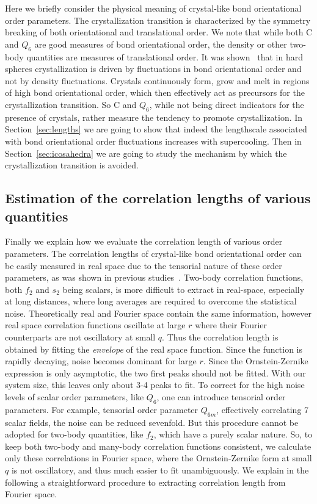 \documentclass[twocolumn,superscriptaddress]{revtex4}
\begin{document}
Here we briefly consider the physical meaning of crystal-like bond orientational order parameters.  
The crystallization transition is characterized by
the symmetry breaking of both orientational and translational order.
We note that while both $\text{C}$ and $Q_6$ are good measures of bond orientational order, the density or other two-body
quantities are measures of translational order.  It was shown~\cite{russo_hs} that in hard spheres crystallization is
driven by fluctuations in bond orientational order and not by density fluctuations. Crystals continuously form, grow and melt
in regions of high bond orientational order, which then effectively act as precursors for the crystallization transition.
So $\text{C}$ and $Q_6$, while not
being direct indicators for the presence of crystals, rather measure the tendency to promote crystallization. 
In Section~\ref{sec:lengths} we are going to show
that indeed the lengthscale associated with bond orientational order fluctuations increases with supercooling. Then in Section~\ref{sec:icosahedra} we are going to study
the mechanism by which the crystallization transition is avoided.

\subsection{Estimation of the correlation lengths of various quantities} 
Finally we explain how we evaluate the correlation length of various order parameters. 
The correlation lengths of crystal-like bond orientational order can be easily measured in real space due to the tensorial nature
of these order parameters, as was shown in previous studies~\cite{tanaka,kawasaki,mathieu_icosahedra,russo_gcm,russo_hs}. Two-body
correlation functions, both $f_2$ and $s_2$ being scalars, is more difficult to extract in real-space, especially at long distances,
where long averages are required to overcome the statistical noise. 
Theoretically real and Fourier space contain the same information, however real space correlation functions oscillate at large $r$ where their Fourier counterparts are not oscillatory at small $q$. 
Thus the correlation length is obtained by fitting the \emph{envelope} of the real space function. Since the function is rapidly decaying, noise becomes dominant 
for large $r$. Since the Ornstein-Zernike expression is only asymptotic, the two first peaks should not be fitted. With our system size, this leaves only about 3-4 peaks 
to fit. To correct for the high noise levels of scalar order parameters, like $Q_6$, one can introduce tensorial order parameters. 
For example, tensorial order parameter $Q_{6m}$, effectively correlating 7 scalar fields, the noise can be reduced sevenfold. 
But this procedure cannot be adopted for two-body quantities, like $f_2$, which have a purely scalar nature. So, to keep both two-body and many-body
correlation functions consistent, we calculate only these correlations in Fourier space, where
the Ornstein-Zernike form at small $q$ is not oscillatory, and thus much easier to fit unambiguously.
We explain in the following a straightforward procedure to extracting correlation length from Fourier space.
\end{document}
